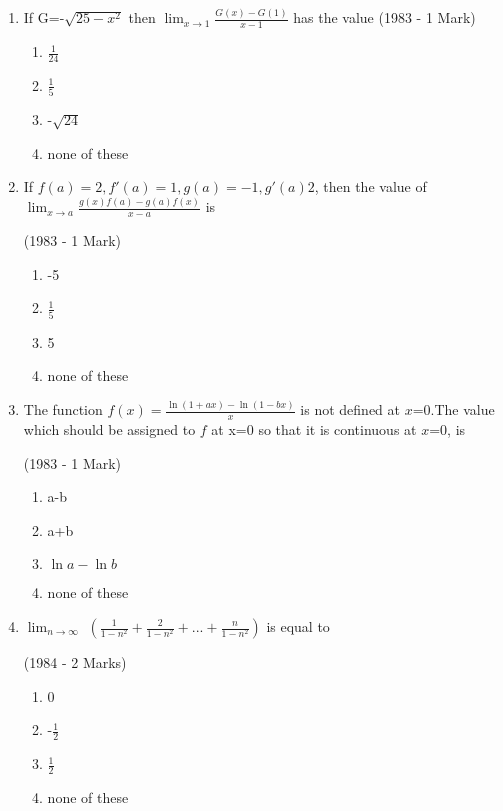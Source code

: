 \documentclass[journal,12pt,twocolumn]{IEEEtran}
\theoremstyle{remark}
\begin{document}
\begin{enumerate}[start=2]
\begin{enumerate}[label=(\alph*)]
           
    \end{enumerate}

\item If G=-$\sqrt{25-x^2}$ then $\lim_{x \to 1}\frac{G(x)-G(1)}{x-1}$ has the value
\hfill    (1983 - 1 Mark)
\begin{enumerate}
    \item $\frac{1}{24}$
    \item $\frac{1}{5}$
    \item -$\sqrt{24}$
    \item none of these
    
\end{enumerate}

\item If $f(a)=2,f'(a)=1,g(a)=-1,g'(a)2$, then the value of $\lim_{x\to a}\frac{g(x)f(a)-g(a)f(x)}{x-a}$ is

  \hfill (1983 - 1 Mark)
     \begin{enumerate}
         \item -5
         \item $\frac{1}{5}$
         \item 5
         \item none of these
     \end{enumerate}

\item The function $f(x)=\frac{\ln{(1+ax)}-\ln{(1-bx)}}{x}$ is not defined at $x$=0.The value which should be assigned to $f$ at x=0 so that it is continuous at $x$=0, is

  \hfill              (1983 - 1 Mark)
    \begin{enumerate}
        \item a-b
        \item a+b
        \item $\ln{a}-\ln{b}$
        \item none of these
        
    \end{enumerate}

\item $\lim_{n\to \infty}$
      $\left(
      \frac{1}{1-n^2} + \frac{2}{1-n^2} +...+ \frac{n}{1-n^2}
       \right)$ is equal to
       
             \hfill(1984 - 2 Marks)
                 \begin{enumerate}
                    \item 0
                    \item -$\frac{1}{2}$
                    \item $\frac{1}{2}$
                    \item none of these
             

\end{enumerate}
\end{enumerate}
\end{document}
